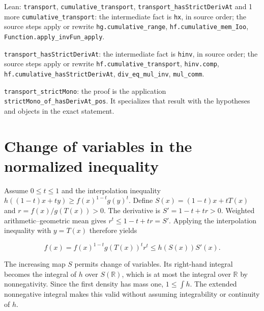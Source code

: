\documentclass[11pt,a4paper]{article}
\begin{document}
\begin{leanbox}{Lean: \texttt{transport}, \texttt{cumulative\_\allowbreak{}transport}, \texttt{transport\_\allowbreak{}hasStrictDerivAt} and 1 more}
\texttt{cumulative\_\allowbreak{}transport}: the intermediate fact is \texttt{hx}, in source order; the source steps apply or rewrite \texttt{hg.\allowbreak{}cumulative\_\allowbreak{}range}, \texttt{hf.\allowbreak{}cumulative\_\allowbreak{}mem\_\allowbreak{}Ioo}, \texttt{Function.\allowbreak{}apply\_\allowbreak{}inv\allowbreak{}Fun\_\allowbreak{}apply}.



\texttt{transport\_\allowbreak{}has\allowbreak{}Strict\allowbreak{}Deriv\allowbreak{}At}: the intermediate fact is \texttt{hinv}, in source order; the source steps apply or rewrite \texttt{hf.\allowbreak{}cumulative\_\allowbreak{}transport}, \texttt{hinv.\allowbreak{}comp}, \texttt{hf.\allowbreak{}cumulative\_\allowbreak{}has\allowbreak{}Strict\allowbreak{}Deriv\allowbreak{}At}, \texttt{div\_\allowbreak{}eq\_\allowbreak{}mul\_\allowbreak{}inv}, \texttt{mul\_\allowbreak{}comm}.



\texttt{transport\_\allowbreak{}strict\allowbreak{}Mono}: the proof is the application \texttt{strict\allowbreak{}Mono\_\allowbreak{}of\_\allowbreak{}has\allowbreak{}Deriv\allowbreak{}At\_\allowbreak{}pos}. It specializes that result with the hypotheses and objects in the exact statement.
\end{leanbox}

\section{\texorpdfstring{Change of variables in the normalized inequality}{Change of variables in the normalized inequality}}


Assume \(0\le t\le1\) and the interpolation inequality \(h((1-t)x+ty)\ge f(x)^{1-t}g(y)^t\). Define \(S(x)=(1-t)x+tT(x)\) and \(r=f(x)/g(T(x))>0\). The derivative is \(S'=1-t+tr>0\). Weighted arithmetic–geometric mean gives \(r^t\le1-t+tr=S'\). Applying the interpolation inequality with \(y=T(x)\) therefore yields

\[f(x)=f(x)^{1-t}g(T(x))^t r^t\le h(S(x))S'(x).\]

The increasing map \(S\) permits change of variables. Its right-hand integral becomes the integral of \(h\) over \(S(\mathbb R)\), which is at most the integral over \(\mathbb R\) by nonnegativity. Since the first density has mass one, \(1\le\int h\). The extended nonnegative integral makes this valid without assuming integrability or continuity of \(h\).
\end{document}
